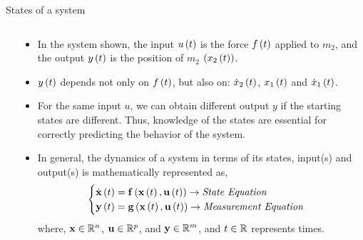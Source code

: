 \documentclass[aspectratio=169]{beamer}
\def\mf{\ensuremath\mathbf}
\def\mb{\ensuremath\mathbb}
\def\lp{\ensuremath\left(}
\def\rp{\ensuremath\right)}
\begin{document}
\begin{frame}{States of a system}
\begin{columns}
\begin{column}{0.3\textwidth}
\end{column}

\begin{column}{0.7\textwidth}
\begin{small}
\begin{itemize}
    \item In the system shown, the input $u\lp t\rp$ is the force $f\lp t\rp$ applied to $m_2$, and the output $y\lp t\rp$ is the position of $m_2$ $\lp x_2\lp t\rp\rp$.

    \item $y\lp t\rp$ depends not only on $f\lp t\rp$, but also on: $\dot{x}_2\lp t\rp$, $x_1\lp t\rp$ and $\dot{x}_1\lp t\rp$.

    \item For the same input $u$, we can obtain different output $y$ if the starting states are different. Thus, knowledge of the states are essential for correctly predicting the behavior of the system.

    \item In general, the dynamics of a system in terms of its states, input(s) and output(s) is mathematically represented as,
    \vspace{-0.2cm}
    \[ \begin{cases} 
    \dot{\mf{x}}\lp t\rp = \mf{f}\lp \mf{x}\lp t\rp, \mf{u}\lp t\rp\rp \rightarrow \text{\textit{State Equation}}\\
    \mf{y}\lp t\rp = \mf{g}\lp \mf{x}\lp t\rp, \mf{u}\lp t\rp\rp \rightarrow \text{\textit{Measurement Equation}}
    \end{cases}
    \]    
    where, $\mf{x} \in \mb{R}^n$, $\mf{u} \in \mb{R}^p$, and $\mf{y} \in \mb{R}^m$, and $t \in \mb{R}$ represents times. 
\end{itemize}
\end{small}
\end{column}
\end{columns}
\end{frame}
\end{document}

